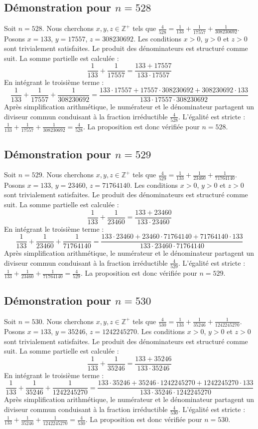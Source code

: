 \documentclass[11pt,a4paper]{article}
\begin{document}
\subsection{Démonstration pour $n = 528$}
Soit $n = 528$. Nous cherchons $x, y, z \in \mathbb{Z}^{+}$ tels que $\frac{4}{528} = \frac{1}{133} + \frac{1}{17557} + \frac{1}{308230692}$.
Posons $x = 133$, $y = 17557$, $z = 308230692$.
Les conditions $x > 0$, $y > 0$ et $z > 0$ sont trivialement satisfaites.
Le produit des dénominateurs est structuré comme suit. La somme partielle est calculée :
$$ \frac{1}{133} + \frac{1}{17557} = \frac{133+17557}{133 \cdot 17557} $$
En intégrant le troisième terme :
$$ \frac{1}{133} + \frac{1}{17557} + \frac{1}{308230692} = \frac{133 \cdot 17557 + 17557 \cdot 308230692 + 308230692 \cdot 133}{133 \cdot 17557 \cdot 308230692} $$
Après simplification arithmétique, le numérateur et le dénominateur partagent un diviseur commun conduisant à la fraction irréductible $\frac{4}{528}$.
L'égalité est stricte : $\frac{1}{133} + \frac{1}{17557} + \frac{1}{308230692} = \frac{4}{528}$.
La proposition est donc vérifiée pour $n = 528$.
\subsection{Démonstration pour $n = 529$}
Soit $n = 529$. Nous cherchons $x, y, z \in \mathbb{Z}^{+}$ tels que $\frac{4}{529} = \frac{1}{133} + \frac{1}{23460} + \frac{1}{71764140}$.
Posons $x = 133$, $y = 23460$, $z = 71764140$.
Les conditions $x > 0$, $y > 0$ et $z > 0$ sont trivialement satisfaites.
Le produit des dénominateurs est structuré comme suit. La somme partielle est calculée :
$$ \frac{1}{133} + \frac{1}{23460} = \frac{133+23460}{133 \cdot 23460} $$
En intégrant le troisième terme :
$$ \frac{1}{133} + \frac{1}{23460} + \frac{1}{71764140} = \frac{133 \cdot 23460 + 23460 \cdot 71764140 + 71764140 \cdot 133}{133 \cdot 23460 \cdot 71764140} $$
Après simplification arithmétique, le numérateur et le dénominateur partagent un diviseur commun conduisant à la fraction irréductible $\frac{4}{529}$.
L'égalité est stricte : $\frac{1}{133} + \frac{1}{23460} + \frac{1}{71764140} = \frac{4}{529}$.
La proposition est donc vérifiée pour $n = 529$.
\subsection{Démonstration pour $n = 530$}
Soit $n = 530$. Nous cherchons $x, y, z \in \mathbb{Z}^{+}$ tels que $\frac{4}{530} = \frac{1}{133} + \frac{1}{35246} + \frac{1}{1242245270}$.
Posons $x = 133$, $y = 35246$, $z = 1242245270$.
Les conditions $x > 0$, $y > 0$ et $z > 0$ sont trivialement satisfaites.
Le produit des dénominateurs est structuré comme suit. La somme partielle est calculée :
$$ \frac{1}{133} + \frac{1}{35246} = \frac{133+35246}{133 \cdot 35246} $$
En intégrant le troisième terme :
$$ \frac{1}{133} + \frac{1}{35246} + \frac{1}{1242245270} = \frac{133 \cdot 35246 + 35246 \cdot 1242245270 + 1242245270 \cdot 133}{133 \cdot 35246 \cdot 1242245270} $$
Après simplification arithmétique, le numérateur et le dénominateur partagent un diviseur commun conduisant à la fraction irréductible $\frac{4}{530}$.
L'égalité est stricte : $\frac{1}{133} + \frac{1}{35246} + \frac{1}{1242245270} = \frac{4}{530}$.
La proposition est donc vérifiée pour $n = 530$.
\end{document}
